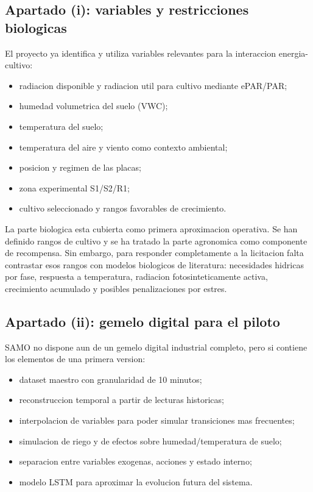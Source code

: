 ﻿\documentclass[11pt,a4paper]{article}
\begin{document}
\subsection{Apartado (i): variables y restricciones biologicas}

El proyecto ya identifica y utiliza variables relevantes para la interaccion energia-cultivo:

\begin{itemize}
    \item radiacion disponible y radiacion util para cultivo mediante ePAR/PAR;
    \item humedad volumetrica del suelo (VWC);
    \item temperatura del suelo;
    \item temperatura del aire y viento como contexto ambiental;
    \item posicion y regimen de las placas;
    \item zona experimental S1/S2/R1;
    \item cultivo seleccionado y rangos favorables de crecimiento.
\end{itemize}

La parte biologica esta cubierta como primera aproximacion operativa. Se han definido rangos de cultivo y se ha tratado la parte agronomica como componente de recompensa. Sin embargo, para responder completamente a la licitacion falta contrastar esos rangos con modelos biologicos de literatura: necesidades hidricas por fase, respuesta a temperatura, radiacion fotosinteticamente activa, crecimiento acumulado y posibles penalizaciones por estres.

\subsection{Apartado (ii): gemelo digital para el piloto}

SAMO no dispone aun de un gemelo digital industrial completo, pero si contiene los elementos de una primera version:

\begin{itemize}
    \item dataset maestro con granularidad de 10 minutos;
    \item reconstruccion temporal a partir de lecturas historicas;
    \item interpolacion de variables para poder simular transiciones mas frecuentes;
    \item simulacion de riego y de efectos sobre humedad/temperatura de suelo;
    \item separacion entre variables exogenas, acciones y estado interno;
    \item modelo LSTM para aproximar la evolucion futura del sistema.
\end{itemize}
\end{document}
